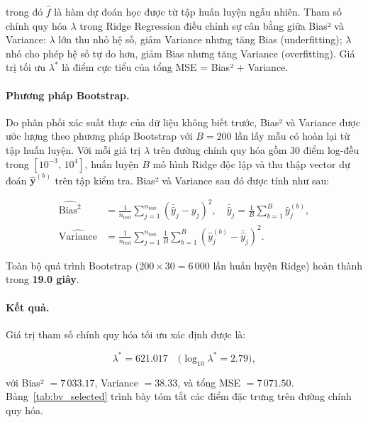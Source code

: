 \noindent trong đó $\hat{f}$ là hàm dự đoán học được từ tập huấn luyện ngẫu nhiên. 
Tham số chính quy hóa $\lambda$ trong Ridge Regression điều chỉnh sự cân bằng giữa Bias² và Variance: $\lambda$ lớn thu nhỏ hệ số, giảm Variance nhưng tăng Bias (underfitting); $\lambda$ nhỏ cho phép hệ số tự do hơn, giảm Bias nhưng tăng Variance (overfitting). Giá trị tối ưu $\lambda^*$ là điểm cực tiểu của tổng MSE = Bias² + Variance.

\paragraph{Phương pháp Bootstrap.}
Do phân phối xác suất thực của dữ liệu không biết trước, Bias² và Variance được ước lượng theo phương pháp Bootstrap với $B = 200$ lần lấy mẫu có hoàn lại từ tập huấn luyện. Với mỗi giá trị $\lambda$ trên đường chính quy hóa gồm 30 điểm log-đều trong $[10^{-3},\, 10^{4}]$, huấn luyện $B$ mô hình Ridge độc lập và thu thập vector dự đoán $\hat{\mathbf{y}}^{(b)}$ trên tập kiểm tra. Bias² và Variance sau đó được tính như sau:

\begin{align}
    \widehat{\text{Bias}^2} &= \frac{1}{n_{\text{test}}} \sum_{j=1}^{n_{\text{test}}} \left(\bar{\hat{y}}_j - y_j\right)^2,
    \quad \bar{\hat{y}}_j = \frac{1}{B}\sum_{b=1}^{B} \hat{y}_j^{(b)},
    \label{eq:bias_est} \\[6pt]
    \widehat{\text{Variance}} &= \frac{1}{n_{\text{test}}} \sum_{j=1}^{n_{\text{test}}} \frac{1}{B}\sum_{b=1}^{B} \left(\hat{y}_j^{(b)} - \bar{\hat{y}}_j\right)^2.
    \label{eq:var_est}
\end{align}

\noindent Toàn bộ quá trình Bootstrap ($200 \times 30 = 6\,000$ lần huấn luyện Ridge) hoàn thành trong \textbf{19.0 giây}.

\paragraph{Kết quả.}
Giá trị tham số chính quy hóa tối ưu xác định được là:

\begin{equation}
    \lambda^* = 621.017 \quad \bigl(\log_{10}\lambda^* = 2.79\bigr),
    \label{eq:lambda_opt}
\end{equation}

\noindent với Bias² $= 7\,033.17$, Variance $= 38.33$, và tổng MSE $= 7\,071.50$. Bảng~\ref{tab:bv_selected} trình bày tóm tắt các điểm đặc trưng trên đường chính quy hóa.

